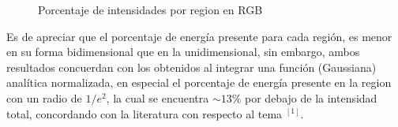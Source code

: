 \documentclass[11pt,letterpaper,twocolumn]{article}
\begin{document}
\begin{figure}[h!]
\begin{center}
\caption{Porcentaje de intensidades por region en RGB}
\end{center}
\end{figure}
\par 
Es de apreciar que el porcentaje de energía presente para cada región, es menor en su forma bidimensional que en la unidimensional, sin embargo, ambos resultados concuerdan con los obtenidos al integrar una función (Gaussiana) analítica normalizada, en especial el porcentaje de energía presente en la region con un radio de $1/e^{2}$, la cual se encuentra $\sim 13 \%$ por debajo de la intensidad total, concordando con la literatura con respecto al tema $^[1]$.
\end{document}
